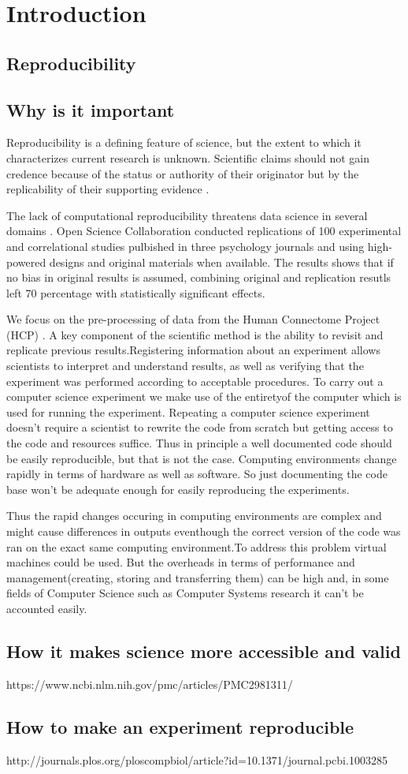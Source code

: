 \chapter{Introduction}
\section{Reproducibility}
\section{Why is it important}

Reproducibility is a defining feature of science, but the extent to which it characterizes current research is unknown. Scientific claims should not gain credence because of the status or authority of their originator but by the replicability of their supporting evidence \cite{aac4716}.  

The lack of computational reproducibility threatens data science in several domains \cite{Gla15}. Open Science Collaboration \cite{aac4716} conducted replications of 100 experimental and correlational studies pulbished in three psychology journals and using high-powered designs and original materials when available. The results shows that if no bias in original results is assumed, combining original and replication resutls left 70 percentage with statistically significant effects.
 
We focus on the pre-processing of data from the Human Connectome Project (HCP) \cite{Gla13}.
A key component of the scientific method is the ability to revisit and replicate previous results.Registering information about an experiment allows scientists to interpret and
understand results, as well as verifying that the experiment was performed according to acceptable procedures. To carry out a computer science experiment we make use of the entiretyof the computer which is used for running the experiment. Repeating a computer science experiment doesn't require a scientist to rewrite the code from scratch but getting access to the code and resources suffice. Thus in principle a well documented code should be easily reproducible, but that is not the case. Computing environments change rapidly in terms of hardware as well as software. So just documenting the code base won't be adequate enough for easily reproducing the experiments.

Thus the rapid changes occuring in computing environments are complex and might cause differences in outputs eventhough the correct version of the code was ran on the exact same computing environment.To address this problem virtual machines could be used. But the overheads in terms of performance and management(creating, storing and transferring them) can be high and, in some fields of Computer Science such as Computer Systems research it can't be accounted easily. \cite{7092948}

\section{How it makes science more accessible and valid}
https://www.ncbi.nlm.nih.gov/pmc/articles/PMC2981311/
\section{How to make an experiment reproducible}
http://journals.plos.org/ploscompbiol/article?id=10.1371/journal.pcbi.1003285

